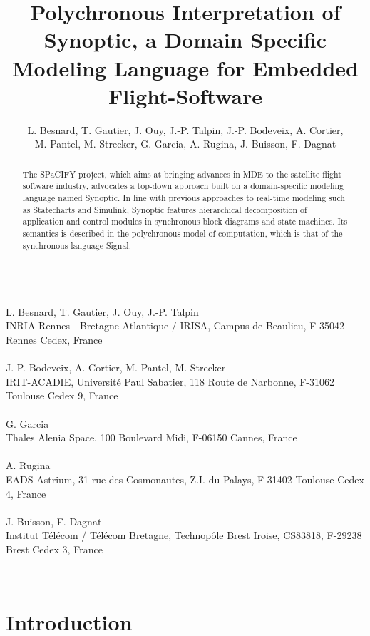 \documentclass[copyright,creativecommons]{eptcs}
\title{Polychronous Interpretation of Synoptic, a Domain Specific Modeling Language for Embedded Flight-Software}
\author{L. Besnard, T. Gautier, J. Ouy, J.-P. Talpin, J.-P. Bodeveix, A. Cortier, \\ M. Pantel, M. Strecker, G. Garcia, A. Rugina, J. Buisson, F. Dagnat
}
\newcommand{\signal}{{\sc Signal}}
\renewcommand{\:}{{:}}
\begin{document}
\maketitle

{\small
\ \\
L. Besnard, T. Gautier, J. Ouy, J.-P. Talpin \\ INRIA Rennes - Bretagne Atlantique / IRISA, Campus de Beaulieu, F-35042 Rennes Cedex, France 
\\ \\
J.-P. Bodeveix, A. Cortier, M. Pantel, M. Strecker \\ IRIT-ACADIE, Universit\'e Paul Sabatier, 118 Route de Narbonne, F-31062 Toulouse Cedex 9, France 
\\ \\
G. Garcia \\ Thales Alenia Space, 100 Boulevard Midi, F-06150 Cannes, France 
\\ \\
A. Rugina \\ EADS Astrium, 31 rue des Cosmonautes, Z.I. du Palays, F-31402 Toulouse Cedex 4, France 
\\ \\
J. Buisson, F. Dagnat \\ Institut T\'el\'ecom / T\'el\'ecom Bretagne, Technop\^ole Brest Iroise, CS83818, F-29238 Brest Cedex 3, France 
}

\ \\
\vspace{-.2cm}
\begin{abstract}
The  SPaCIFY project, which aims at bringing advances in MDE to the satellite flight software industry, advocates a top-down approach built on a domain-specific modeling language named Synoptic. In line with previous approaches to real-time modeling such as Statecharts and Simulink, Synoptic features hierarchical decomposition of application and control modules in synchronous block diagrams and state machines. Its semantics is described in the polychronous model of computation, which is that of the synchronous language \signal.
\end{abstract}

\section{Introduction}
\label{Introduction}
\end{document}
